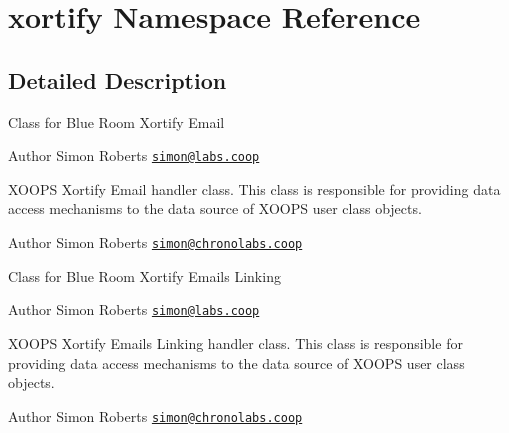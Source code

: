 \hypertarget{namespacexortify}{\section{xortify Namespace Reference}
\label{namespacexortify}
}


\subsection{Detailed Description}
Class for Blue Room Xortify Email \begin{DoxyAuthor}{Author}
Simon Roberts \href{mailto:simon@labs.coop}{\tt simon@labs.\-coop}
\end{DoxyAuthor}
X\-O\-O\-P\-S Xortify Email handler class. This class is responsible for providing data access mechanisms to the data source of X\-O\-O\-P\-S user class objects.

\begin{DoxyAuthor}{Author}
Simon Roberts \href{mailto:simon@chronolabs.coop}{\tt simon@chronolabs.\-coop}
\end{DoxyAuthor}
Class for Blue Room Xortify Emails Linking \begin{DoxyAuthor}{Author}
Simon Roberts \href{mailto:simon@labs.coop}{\tt simon@labs.\-coop}
\end{DoxyAuthor}
X\-O\-O\-P\-S Xortify Emails Linking handler class. This class is responsible for providing data access mechanisms to the data source of X\-O\-O\-P\-S user class objects.

\begin{DoxyAuthor}{Author}
Simon Roberts \href{mailto:simon@chronolabs.coop}{\tt simon@chronolabs.\-coop} 
\end{DoxyAuthor}
